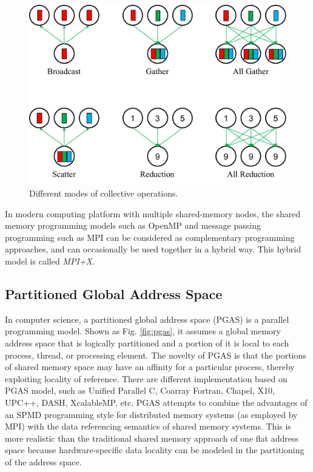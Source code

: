 \begin{figure}[t]
	\centering
	\includegraphics[width=0.99\linewidth]{fig/collective.pdf}
	\caption{Different modes of collective operations.}
	\label{mpi_collective}
\end{figure}

In modern computing platform with multiple shared-memory nodes, the shared memory programming models such as OpenMP and message passing programming such as MPI can be considered as complementary programming approaches, and can occasionally be used together in a hybrid way. This hybrid model is called \textit{MPI+X}.

\subsection{Partitioned Global Address Space}

In computer science, a partitioned global address space (PGAS) is a parallel programming model. Shown as Fig. \ref{fig:pgas}, it assumes a global memory address space that is logically partitioned and a portion of it is local to each process, thread, or processing element. The novelty of PGAS is that the portions of shared memory space may have an affinity for a particular process, thereby exploiting locality of reference. There are different implementation based on PGAS model, such as Unified Parallel C, Coarray Fortran, Chapel, X10, UPC++, DASH, XcalableMP, etc. PGAS attempts to combine the advantages of an SPMD programming style for distributed memory systems (as employed by MPI) with the data referencing semantics of shared memory systems. This is more realistic than the traditional shared memory approach of one flat address space because hardware-specific data locality can be modeled in the partitioning of the address space.

